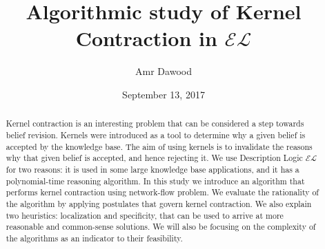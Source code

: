 \documentclass{sfuthesis}
\title{Algorithmic study of Kernel Contraction in $\mathcal{EL}$}
\author{Amr Dawood}
\date{September 13, 2017}
\theoremstyle{plain}
\theoremstyle{definition}
\begin{document}
\frontmatter
\maketitle{}
\makecommittee{}

\begin{abstract}
Kernel contraction is an interesting problem that can be considered a step towards belief revision. Kernels were introduced as a tool to determine why a given belief is accepted by the knowledge base. The aim of using kernels is to invalidate the reasons why that given belief is accepted, and hence rejecting it. We use Description Logic $\mathcal{EL}$ for two reasons: it is used in some large knowledge base applications, and it has a polynomial-time reasoning algorithm. In this study we introduce an algorithm that performs kernel contraction using network-flow problem. We evaluate the rationality of the algorithm by applying postulates that govern kernel contraction. We also explain two heuristics: localization and specificity, that can be used to arrive at more reasonable and common-sense solutions. We will also be focusing on the complexity of the algorithms as an indicator to their feasibility.
\end{abstract}


%
%

\tableofcontents\clearpage
{}\listoffigures





%
%

\mainmatter%
















\end{document}
